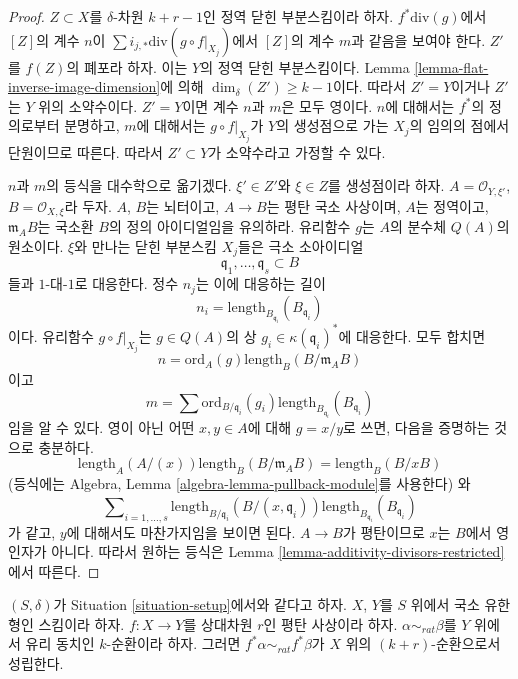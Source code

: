 \begin{proof}
$Z \subset X$를 $\delta$-차원 $k + r - 1$인 정역 닫힌 부분스킴이라
하자. $f^*\text{div}(g)$에서 $[Z]$의 계수 $n$이
$\sum i_{j, *} \text{div}(g \circ f|_{X_j})$에서 $[Z]$의 계수 $m$과
같음을 보여야 한다. $Z'$를 $f(Z)$의 폐포라 하자. 이는 $Y$의 정역
닫힌 부분스킴이다. Lemma \ref{lemma-flat-inverse-image-dimension}에
의해 $\dim_\delta(Z') \geq k - 1$이다. 따라서 $Z' = Y$이거나 $Z'$는
$Y$ 위의 소약수이다. $Z' = Y$이면 계수 $n$과 $m$은 모두 영이다.
$n$에 대해서는 $f^*$의 정의로부터 분명하고, $m$에 대해서는
$g \circ f|_{X_j}$가 $Y$의 생성점으로 가는 $X_j$의 임의의 점에서
단원이므로 따른다. 따라서 $Z' \subset Y$가 소약수라고 가정할 수 있다.

\medskip\noindent
$n$과 $m$의 등식을 대수학으로 옮기겠다. $\xi' \in Z'$와
$\xi \in Z$를 생성점이라 하자. $A = \mathcal{O}_{Y, \xi'}$,
$B = \mathcal{O}_{X, \xi}$라 두자. $A$, $B$는 뇌터이고,
$A \to B$는 평탄 국소 사상이며, $A$는 정역이고,
$\mathfrak m_AB$는 국소환 $B$의 정의 아이디얼임을 유의하라. 유리함수
$g$는 $A$의 분수체 $Q(A)$의 원소이다. $\xi$와 만나는 닫힌 부분스킴
$X_j$들은 극소 소아이디얼
$$
\mathfrak q_1, \ldots, \mathfrak q_s \subset B
$$
들과 $1$-대-$1$로 대응한다. 정수 $n_j$는 이에 대응하는 길이
$$
n_i = \text{length}_{B_{\mathfrak q_i}}(B_{\mathfrak q_i})
$$
이다. 유리함수 $g \circ f|_{X_j}$는 $g \in Q(A)$의 상
$g_i \in \kappa(\mathfrak q_i)^*$에 대응한다. 모두 합치면
$$
n = \text{ord}_A(g) \text{length}_B(B/\mathfrak m_AB)
$$
이고
$$
m = \sum \text{ord}_{B/\mathfrak q_i}(g_i)
\text{length}_{B_{\mathfrak q_i}}(B_{\mathfrak q_i})
$$
임을 알 수 있다. 영이 아닌 어떤 $x, y \in A$에 대해 $g = x/y$로
쓰면, 다음을 증명하는 것으로 충분하다.
$$
\text{length}_A(A/(x)) \text{length}_B(B/\mathfrak m_AB) =
\text{length}_B(B/xB)
$$
(등식에는 Algebra, Lemma \ref{algebra-lemma-pullback-module}를 사용한다)
와
$$
\sum\nolimits_{i = 1, \ldots, s}
\text{length}_{B/\mathfrak q_i}(B/(x, \mathfrak q_i))
\text{length}_{B_{\mathfrak q_i}}(B_{\mathfrak q_i})
$$
가 같고, $y$에 대해서도 마찬가지임을 보이면 된다. $A \to B$가
평탄이므로 $x$는 $B$에서 영인자가 아니다. 따라서 원하는 등식은
Lemma \ref{lemma-additivity-divisors-restricted}에서 따른다.
\end{proof}

\begin{lemma}
\label{lemma-flat-pullback-rational-equivalence}
$(S, \delta)$가 Situation \ref{situation-setup}에서와 같다고 하자.
$X$, $Y$를 $S$ 위에서 국소 유한형인 스킴이라 하자.
$f : X \to Y$를 상대차원 $r$인 평탄 사상이라 하자.
$\alpha \sim_{rat} \beta$를 $Y$ 위에서 유리 동치인 $k$-순환이라 하자.
그러면 $f^*\alpha \sim_{rat} f^*\beta$가 $X$ 위의 $(k + r)$-순환으로서
성립한다.
\end{lemma}

